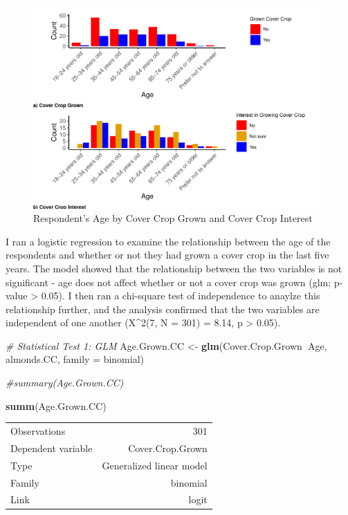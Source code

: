 \documentclass[12pt,]{article}
\newenvironment{Shaded}{\begin{snugshade}}{\end{snugshade}}
\newcommand{\KeywordTok}[1]{\textcolor[rgb]{0.13,0.29,0.53}{\textbf{#1}}}
\newcommand{\DataTypeTok}[1]{\textcolor[rgb]{0.13,0.29,0.53}{#1}}
\newcommand{\StringTok}[1]{\textcolor[rgb]{0.31,0.60,0.02}{#1}}
\newcommand{\CommentTok}[1]{\textcolor[rgb]{0.56,0.35,0.01}{\textit{#1}}}
\newcommand{\OperatorTok}[1]{\textcolor[rgb]{0.81,0.36,0.00}{\textbf{#1}}}
\newcommand{\NormalTok}[1]{#1}
\begin{document}
\begin{figure}
\includegraphics[width=0.9\linewidth]{Project_Template_files/figure-latex/combined age graphs-1} \caption{Respondent's Age by Cover Crop Grown and Cover Crop Interest}\label{fig:combined age graphs}
\end{figure}

\FloatBarrier

I ran a logistic regression to examine the relationship between the age
of the respondents and whether or not they had grown a cover crop in the
last five years. The model showed that the relationship between the two
variables is not significant - age does not affect whether or not a
cover crop was grown (glm; p-value \textgreater{} 0.05). I then ran a
chi-square test of independence to anaylze this relationship further,
and the analysis confirmed that the two variables are independent of one
another (X\^{}2(7, N = 301) = 8.14, p \textgreater{} 0.05).

\begin{Shaded}
\begin{Highlighting}[]
\CommentTok{# Statistical Test 1: GLM}
\NormalTok{Age.Grown.CC <-}\StringTok{ }\KeywordTok{glm}\NormalTok{(Cover.Crop.Grown}\OperatorTok{~}\NormalTok{Age, almonds.CC, }\DataTypeTok{family =}\NormalTok{ binomial)}

\CommentTok{#summary(Age.Grown.CC)}

\KeywordTok{summ}\NormalTok{(Age.Grown.CC)}
\end{Highlighting}
\end{Shaded}

\begin{table}[!h]
\centering
\begin{tabular}{lr}
\toprule
\rowcolor{gray!6}  Observations & 301\\
Dependent variable & Cover.Crop.Grown\\
\rowcolor{gray!6}  Type & Generalized linear model\\
Family & binomial\\
\rowcolor{gray!6}  Link & logit\\
\bottomrule
\end{tabular}
\end{table}
\end{document}
